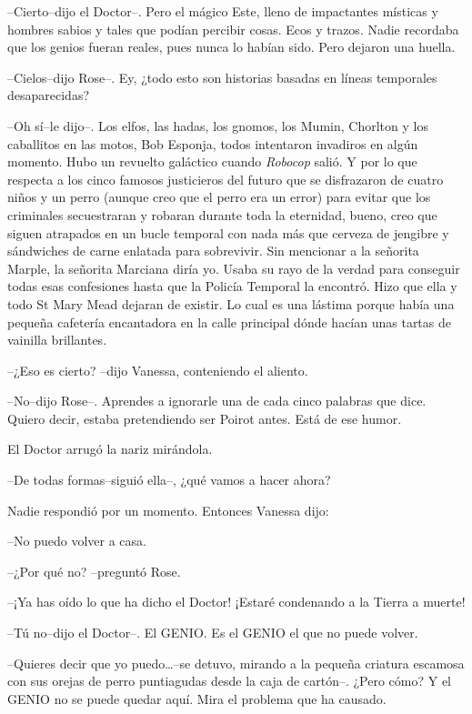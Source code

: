 --Cierto--dijo el Doctor--. Pero el mágico Este, lleno de impactantes
místicas y hombres sabios y tales que podían percibir cosas. Ecos y
trazos. Nadie recordaba que los genios fueran reales, pues nunca lo
habían sido. Pero dejaron una huella.

--Cielos--dijo Rose--. Ey, ¿todo esto son historias basadas en líneas
temporales desaparecidas?

--Oh sí--le dijo--. Los elfos, las hadas, los gnomos, los Mumin,
Chorlton y los caballitos en las motos, Bob Esponja, todos intentaron
invadiros en algún momento. Hubo un revuelto galáctico cuando
\emph{Robocop} salió. Y por lo que respecta a los cinco famosos
justicieros del futuro que se disfrazaron de cuatro niños y un perro
(aunque creo que el perro era un error) para evitar que los criminales
secuestraran y robaran durante toda la eternidad, bueno, creo que siguen
atrapados en un bucle temporal con nada más que cerveza de jengibre y
sándwiches de carne enlatada para sobrevivir. Sin mencionar a la
señorita Marple, la señorita Marciana diría yo. Usaba su rayo de la
verdad para conseguir todas esas confesiones hasta que la Policía
Temporal la encontró. Hizo que ella y todo St Mary Mead dejaran de
existir. Lo cual es una lástima porque había una pequeña cafetería
encantadora en la calle principal dónde hacían unas tartas de vainilla
brillantes.

--¿Eso es cierto? --dijo Vanessa, conteniendo el aliento.

--No--dijo Rose--. Aprendes a ignorarle una de cada cinco palabras que
dice. Quiero decir, estaba pretendiendo ser Poirot antes. Está de ese
humor.

El Doctor arrugó la nariz mirándola.

--De todas formas--siguió ella--, ¿qué vamos a hacer ahora?

Nadie respondió por un momento. Entonces Vanessa dijo:

--No puedo volver a casa.

--¿Por qué no? --preguntó Rose.

--¡Ya has oído lo que ha dicho el Doctor! ¡Estaré condenando a la Tierra
a muerte!

--Tú no--dijo el Doctor--. El GENIO. Es el GENIO el que no puede volver.

--Quieres decir que yo puedo\ldots{}--se detuvo, mirando a la pequeña
criatura escamosa con sus orejas de perro puntiagudas desde la caja de
cartón--. ¿Pero cómo? Y el GENIO no se puede quedar aquí. Mira el
problema que ha causado.

